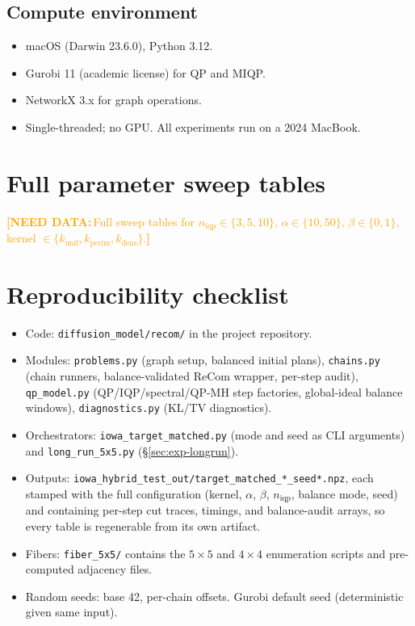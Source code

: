 \documentclass[11pt]{article}
\newcommand{\needdata}[1]{\textcolor{orange}{\textbf{[NEED DATA:}\,#1\textbf{]}}}
\begin{document}
\subsection{Compute environment}\label{app:compute}

\begin{itemize}
  \item macOS (Darwin 23.6.0), Python 3.12.
  \item Gurobi 11 (academic license) for QP and MIQP.
  \item NetworkX 3.x for graph operations.
  \item Single-threaded; no GPU. All experiments run on a 2024
    MacBook.
\end{itemize}

\section{Full parameter sweep tables}\label{app:sweeps}

\needdata{Full sweep tables for $n_{\mathrm{iqp}} \in \{3, 5, 10\}$,
$\alpha \in \{10, 50\}$, $\beta \in \{0, 1\}$, kernel $\in \{k_{\mathrm{unif}},
k_{\mathrm{perim}}, k_{\mathrm{dens}}\}$.}

\section{Reproducibility checklist}\label{app:reproducibility}

\begin{itemize}
  \item Code: \texttt{diffusion\_model/recom/} in the project
    repository.
  \item Modules: \texttt{problems.py} (graph setup, balanced initial
    plans), \texttt{chains.py} (chain runners, balance-validated
    ReCom wrapper, per-step audit), \texttt{qp\_model.py}
    (QP/IQP/spectral/QP-MH step factories, global-ideal balance
    windows), \texttt{diagnostics.py} (KL/TV diagnostics).
  \item Orchestrators: \texttt{iowa\_target\_matched.py} (mode and
    seed as CLI arguments) and \texttt{long\_run\_5x5.py}
    (\S\ref{sec:exp-longrun}).
  \item Outputs:
    \texttt{iowa\_hybrid\_test\_out/target\_matched\_*\_seed*.npz},
    each stamped with the full configuration (kernel, $\alpha$,
    $\beta$, $n_{\mathrm{iqp}}$, balance mode, seed) and containing
    per-step cut traces, timings, and balance-audit arrays, so every
    table is regenerable from its own artifact.
  \item Fibers: \texttt{fiber\_5x5/} contains the $5 \times 5$ and
    $4 \times 4$ enumeration scripts and pre-computed
    adjacency files.
  \item Random seeds: base 42, per-chain offsets. Gurobi default seed
    (deterministic given same input).
\end{itemize}



\end{document}
